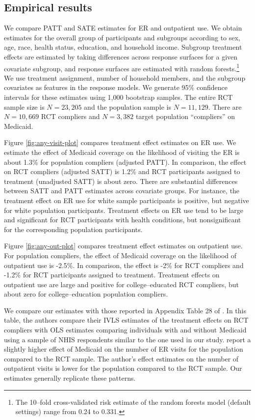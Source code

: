 \documentclass[12pt]{article}
\begin{document}
\subsection{Empirical results}

We compare PATT and SATE estimates for ER and outpatient use. We obtain estimates for the overall group of participants and subgroups according to sex, age, race, health status, education, and household income. Subgroup treatment effects are estimated by taking differences across response surfaces for a given covariate subgroup, and response surfaces are estimated with random forests.\footnote{The 10--fold cross-validated risk estimate of the random forests model (default settings) range from 0.24 to 0.331.} We use treatment assignment, number of household members, and the subgroup covariates as features in the response models. We generate 95\% confidence intervals for these estimates using 1,000 bootstrap samples. The entire RCT sample size is $N=23,205$ and the population sample is $N=11,129$. There are $N=10,669$ RCT compliers and $N=3,382$ target population ``compliers'' on Medicaid. 

Figure \ref{fig:any-visit-plot} compares treatment effect estimates on ER use. We estimate the effect of Medicaid coverage on the likelihood of visiting the ER is about 1.3\% for population compliers (adjusted PATT). In comparison, the effect on RCT compliers (adjusted SATT) is 1.2\% and RCT participants assigned to treatment (unadjusted SATT) is about zero. There are substantial differences between SATT and PATT estimates across covariate groups. For instance, the treatment effect on ER use for white sample participants is positive, but negative for white population participants. Treatment effects on ER use tend to be large and significant for RCT participants with health conditions, but nonsignificant for the corresponding population participants.

Figure \ref{fig:any-out-plot} compares treatment effect estimates on outpatient use. For population compliers, the effect of Medicaid coverage on the likelihood of outpatient use is -2.5\%. In comparison, the effect is -2\% for RCT compliers and -1.2\% for RCT participants assigned to treatment. Treatment effects on outpatient use are large and positive for college--educated RCT compliers, but about zero for college--education population compliers. 



We compare our estimates with those reported in Appendix Table 28 of \citet{finkelstein2012}. In this table, the authors compare their IVLS estimates of the treatment effects on RCT compliers with OLS estimates comparing individuals with and without Medicaid using a sample of NHIS respondents similar to the one used in our study. \citet{finkelstein2012} report a slightly higher effect of Medicaid on the number of ER visits for the population compared to the RCT sample. The author's effect estimates on the number of outpatient visits is lower for the population compared to the RCT sample. Our estimates generally replicate these patterns. 
\end{document}
